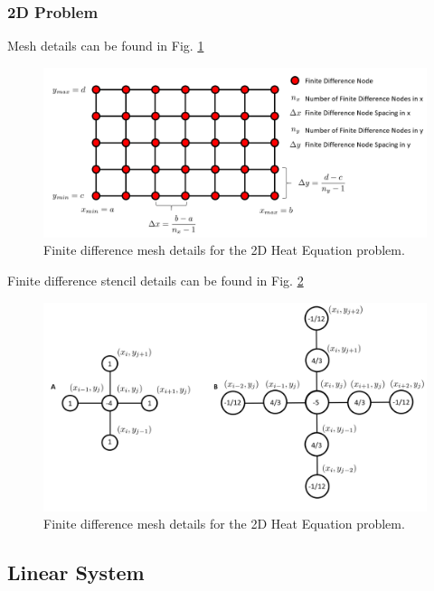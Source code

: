 \documentclass[letterpaper,12pt]{article}
\begin{document}
\subsubsection{2D Problem}
Mesh details can be found in Fig. \ref{2DMesh}

\begin{figure}[h]
\centering
\includegraphics[width=1 \textwidth]{2D_Mesh.PNG}
\caption{Finite difference mesh details for the 2D Heat Equation problem.}
\label{2DMesh}
\end{figure}

Finite difference stencil details can be found in Fig. \ref{2DStencil}

\begin{figure}[h]
\centering
\includegraphics[width=1 \textwidth]{2D_Stencil.PNG}
\caption{Finite difference mesh details for the 2D Heat Equation problem.}
\label{2DStencil}
\end{figure} 
\subsection{Linear System}
\end{document}
